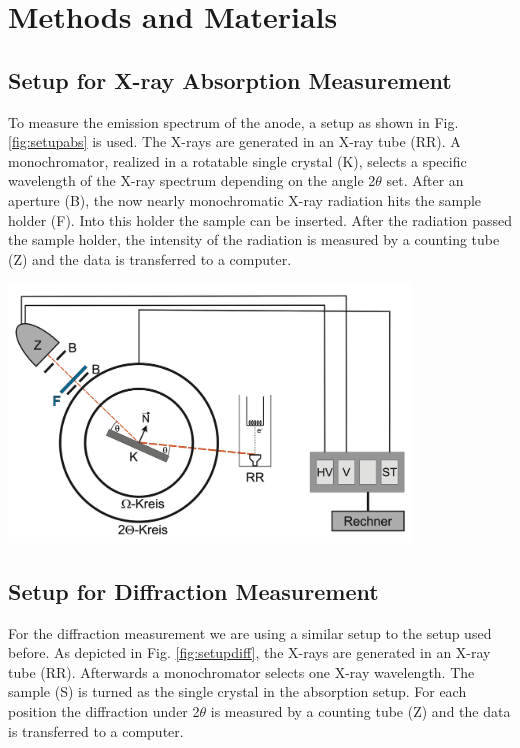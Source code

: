 
\chapter{Methods and Materials}
\label{chap:methods}


\section{Setup for X-ray Absorption Measurement}
\label{sec:SetupAbsorb}

To measure the emission spectrum of the anode, a setup as shown in Fig. \ref{fig:setupabs} is used. The X-rays are generated in an X-ray tube (RR). A monochromator, realized in a rotatable single crystal (K), 
selects a specific wavelength of the X-ray spectrum depending on the angle 2$\theta$ set. After an aperture (B), the now nearly monochromatic X-ray radiation hits the sample holder (F). Into this holder the sample
can be inserted. After the radiation passed the sample holder, the intensity of the radiation is measured by a counting tube (Z) and the data is transferred to a computer.

\begin{center}
    \captionsetup{type = figure}
    \includegraphics[width = 0.8\textwidth]{Pictures/SetupAbsorb.png}
    \label{fig:setupabs}
\end{center}

\newpage
\section{Setup for Diffraction Measurement}
\label{sec:SetupDiff}

For the diffraction measurement we are using a similar setup to the setup used before. As depicted in Fig. \ref{fig:setupdiff}, the X-rays are generated in an X-ray tube (RR). Afterwards a monochromator selects one X-ray wavelength. 
The sample (S) is turned as the single crystal in the absorption setup. For each position the diffraction under 2$\theta$ is measured by a counting tube (Z) and the data is transferred to a computer.

